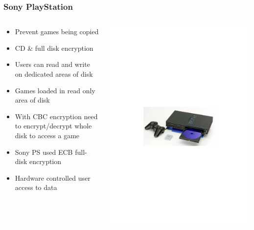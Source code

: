 \documentclass[aspectratio=169, lualatex, handout, 10pt,dvipsnames,svgnames]{beamer} %
\begin{document}
\begin{frame}
  \frametitle{Sony PlayStation}

  \begin{columns}
    \begin{column}{2in}
      \begin{itemize}
      \item<2-> Prevent games being copied
      \item<3-> CD \& full disk encryption
      \item<4-> Users can read and write on dedicated areas of disk
      \item<5-> Games loaded in read only area of disk
      \item<6-> With CBC encryption need to encrypt/decrypt whole disk to access a game
      \item<7-> Sony PS used ECB full-disk encryption
      \item<8-> Hardware controlled user access to data
      \end{itemize}
    \end{column}
    \begin{column}{2in}
      \includegraphics[scale=0.5]{Images/ps2.pdf}
    \end{column}
  \end{columns}
\end{frame}
\end{document}
